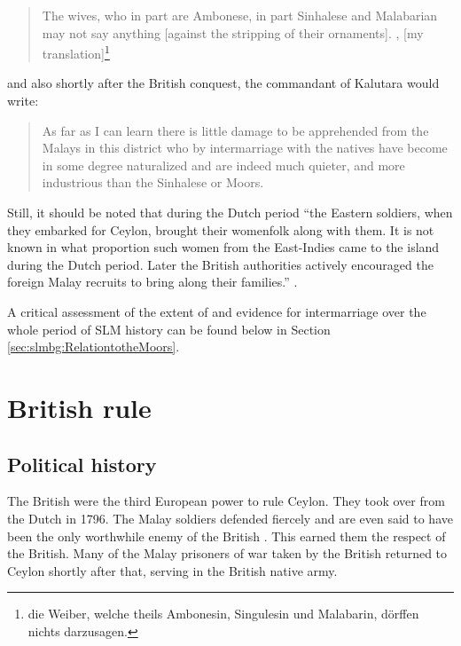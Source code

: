 \begin{quote}
The wives, who in part are Ambonese, in part Sinhalese and Malabarian may not say anything [against the stripping of their ornaments]. \citep[106]{Schweitzer1931}, [my translation]\footnote{\el  die Weiber, welche theils Ambonesin, Singulesin und Malabarin, dörffen nichts darzusagen.}
\end{quote}

and also shortly after the British conquest, the commandant of Kalutara would write:

\begin{quote}
     As far as I can learn there is little damage to be apprehended from the Malays in this district who by intermarriage with the natives have become in some degree naturalized and are indeed much quieter, and more industrious than the Sinhalese or Moors. \citep[61]{Hussainmiya1990}
\end{quote}

Still, it should be noted that during the Dutch period ``the Eastern soldiers, when they embarked for Ceylon, brought their womenfolk along with them. It is not known in what proportion such women from the East-Indies came to the island during the Dutch period. Later the British authorities actively encouraged the foreign Malay recruits to bring along their families.'' \citep[47]{Hussainmiya1990}.


A critical assessment of the extent of and evidence for intermarriage over the whole period of SLM history can be found below in Section \ref{sec:slmbg:RelationtotheMoors}.


\section{British rule}\label{sec:slmbg:HistoryduringBritishrule}
\subsection{Political history}\label{sec:slmbg:British:Political history}
The British were the third European power to rule Ceylon.  They took over from the Dutch in 1796. The Malay soldiers defended fiercely and are even said to have been the only worthwhile enemy of the British \citep[cf.][42,44]{Powell1973}. This earned them the respect of the British. Many of the Malay prisoners of war taken by the British returned to Ceylon shortly after that, serving in the British native army.

